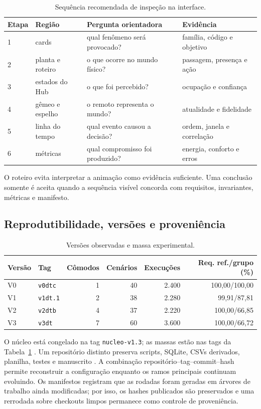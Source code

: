 \documentclass[10pt,a4paper]{article}
\begin{document}
\begin{table}[ht]
\centering
\caption{Sequência recomendada de inspeção na interface.}
\small
\begin{tabularx}{\linewidth}{p{0.8cm}p{3.1cm}X p{3.0cm}}
\toprule
Etapa & Região & Pergunta orientadora & Evidência \\
\midrule
1 & cards & qual fenômeno será provocado? & família, código e objetivo \\
2 & planta e roteiro & o que ocorre no mundo físico? & passagem, presença e ação \\
3 & estados do Hub & o que foi percebido? & ocupação e confiança \\
4 & gêmeo e espelho & o remoto representa o mundo? & atualidade e fidelidade \\
5 & linha do tempo & qual evento causou a decisão? & ordem, janela e correlação \\
6 & métricas & qual compromisso foi produzido? & energia, conforto e erros \\
\bottomrule
\end{tabularx}
\end{table}

O roteiro evita interpretar a animação como evidência suficiente. Uma conclusão somente é aceita quando a sequência visível concorda com requisitos, invariantes, métricas e manifesto.

\subsection{Reprodutibilidade, versões e proveniência}

\begin{table}[ht]
\centering
\caption{Versões observadas e massa experimental.}
\label{tab:versoes}
\small
\begin{tabular}{llrrrr}
\toprule
Versão & Tag & Cômodos & Cenários & Execuções & Req. ref./grupo (\%) \\
\midrule
V0 & \texttt{v0dtc} & 1 & 40 & 2.400 & 100,00/100,00 \\
V1 & \texttt{v1dt.1} & 2 & 38 & 2.280 & 99,91/87,81 \\
V2 & \texttt{v2dtb} & 4 & 37 & 2.220 & 100,00/66,85 \\
V3 & \texttt{v3dt} & 7 & 60 & 3.600 & 100,00/66,72 \\
\bottomrule
\end{tabular}
\end{table}

O núcleo está congelado na tag \texttt{nucleo-v1.3}; as massas estão nas tags da Tabela~\ref{tab:versoes} \citep{reg10ksoftware}. Um repositório distinto preserva scripts, SQLite, CSVs derivados, planilha, testes e manuscrito \citep{reg10krepro}. A combinação repositório--tag--commit--hash permite reconstruir a configuração enquanto os ramos principais continuam evoluindo. Os manifestos registram que as rodadas foram geradas em árvores de trabalho ainda modificadas; por isso, os hashes publicados são preservados e uma rerrodada sobre checkouts limpos permanece como controle de proveniência.
\end{document}
